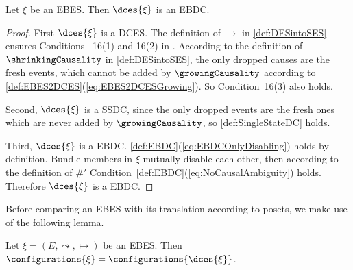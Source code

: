 \documentclass[runningheads,a4paper]{llncs}
\begin{document}
\begin{lemma}
\label{lma:EmdeddingIsEBDC}
Let $\xi$ be an EBES. Then $\dces{\xi}$ is an EBDC.
\end{lemma}

\begin{proof}
First $\dces{\xi}$ is a DCES. The definition of $\rightarrow$ in \ref{def:DESintoSES} ensures Conditions~
16(1) and
16(2) in \cite{dynamicCausality15}. According to the definition of
$\shrinkingCausality$ in \ref{def:DESintoSES}, the only dropped causes are the
fresh events, which cannot be added by $\growingCausality$ according to
\ref{def:EBES2DCES}(\ref{eq:EBES2DCESGrowing}). So Condition~16(3) also holds.

Second, $\dces{\xi} $ is a SSDC, since the only dropped events are the
fresh ones which are never added by $\growingCausality$, so \ref{def:SingleStateDC} holds.

Third,
$\dces{\xi}$ is a EBDC. \ref{def:EBDC}(\ref{eq:EBDCOnlyDisabling})
holds by definition. 
Bundle members in $\xi$ mutually disable each other, then according to
the definition of $\#'$ Condition~\ref{def:EBDC}(\ref{eq:NoCausalAmbiguity})
holds. Therefore $\dces{\xi} $ is a EBDC.
\end{proof}

Before comparing an EBES with its translation according to posets, we make use
of the following lemma.

\begin{lemma}
\label{thm:EBESandEBDCconfigEqui}
Let $\xi = \left(E, \leadsto, \mapsto\right)$ be an EBES. Then $\configurations{\xi} = \configurations{\dces{\xi}}$.
\end{lemma}
\end{document}
